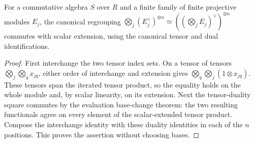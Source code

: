 \begin{lemma}
\label{lem:dual-regrouping-base-change}
\leanok
For a commutative algebra $S$ over $R$ and a finite family of finite
projective modules $E_j$, the canonical regrouping
$\bigotimes_j(E_j^\vee)^{\otimes n}\simeq
 ( (\bigotimes_j E_j)^\vee)^{\otimes n}$ commutes with scalar
extension, using the canonical tensor and dual identifications.
\end{lemma}
\begin{proof}
First interchange the two tensor index sets. On a tensor of tensors
$\bigotimes_j\bigotimes_q x_{jq}$, either order of interchange and
extension gives $\bigotimes_q\bigotimes_j(1\otimes x_{jq})$.
These tensors span the iterated tensor product, so the equality holds
on the whole module and, by scalar linearity, on its extension.
Next the tensor-duality square commutes by the evaluation
base-change theorem: the two resulting functionals agree on every
element of the scalar-extended tensor product. Compose the interchange
identity with these duality identities in each of the $n$ positions.
This proves the assertion without choosing bases.
\end{proof}

